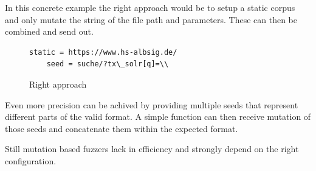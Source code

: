 \documentclass[journal=tosc,final]{iacrtrans}
\begin{document}
In this concrete example the right approach would be to setup a  static corpus and only mutate the string of the file path and parameters. 
These can then be combined and send out.


\begin{figure}[h]
 \caption{Right approach}
 \begin{lstlisting}[style=code]
	static = https://www.hs-albsig.de/  
	seed = suche/?tx\_solr[q]=\\
 \end{lstlisting}
\end{figure}


Even more precision can be achived by providing multiple seeds that represent different parts of the valid format. A simple function can then receive mutation of those seeds and concatenate them within the expected format.

Still mutation based fuzzers lack in efficiency and strongly depend on the right configuration. 
\newpage
\end{document}
